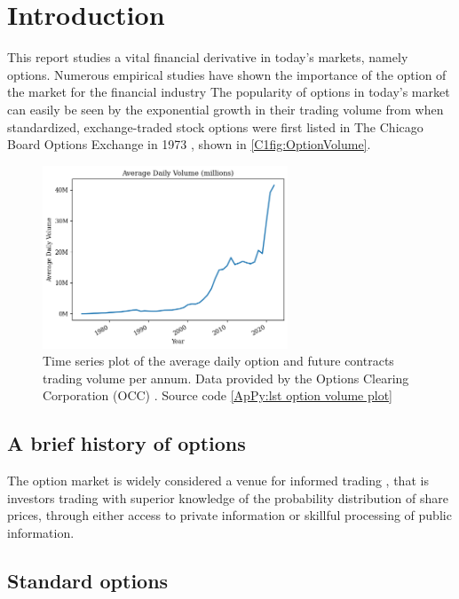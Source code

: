 \chapter{Introduction}

This report studies a vital financial derivative in today's markets, namely options. Numerous empirical studies have shown the importance of the option of the market for the financial industry The popularity of options in today's market can easily be seen by the exponential growth in their trading volume from when standardized, exchange-traded stock options were first listed in The Chicago Board Options Exchange in 1973 \cite[pp.51-52]{markham2002financial}, shown in \autoref{C1fig:OptionVolume}. 

\begin{figure}[H]
    \centering
    \includegraphics[width=0.65\textwidth]{Chapters/C1/plots/OptionVolume.png}
    \caption{Time series plot of the average daily option and future contracts trading volume per annum. Data provided by the Options Clearing Corporation (OCC) \cite{THEOCC}. Source code \autoref{ApPy:lst option volume plot}}
    \label{C1fig:OptionVolume}
\end{figure}

\section{A brief history of options}

The option market is widely considered a venue for informed trading \cite{black1975,li2021effect,hu2014,chak2004}, that is investors trading with superior knowledge of the probability distribution of share prices, through either access to private information or skillful processing of public information. 

\section{Standard options}

